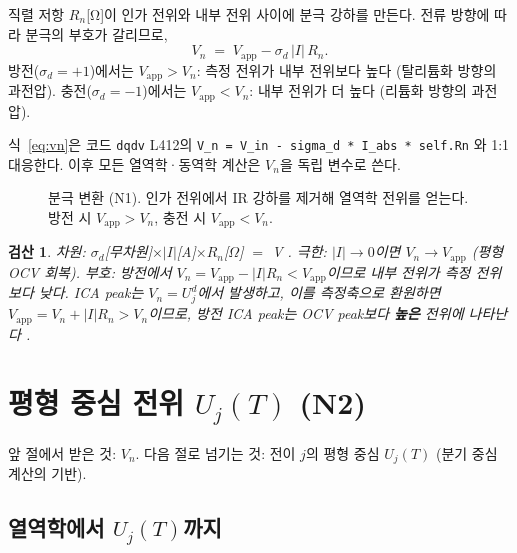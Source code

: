 \documentclass[11pt,a4paper]{article}
\newtheorem*{verifybox}{검산}
\newcommand{\app}{\mathrm{app}}
\begin{document}
직렬 저항 $R_n$[Ω]이 인가 전위와 내부 전위 사이에 분극 강하를 만든다.
전류 방향에 따라 분극의 부호가 갈리므로,
\begin{equation}
  \boxed{V_n \;=\; V_\app - \sigma_d\,|I|\,R_n.}
  \label{eq:vn}
\end{equation}
방전($\sigma_d=+1$)에서는 $V_\app > V_n$: 측정 전위가 내부 전위보다 높다
(탈리튬화 방향의 과전압).
충전($\sigma_d=-1$)에서는 $V_\app < V_n$: 내부 전위가 더 높다
(리튬화 방향의 과전압).

식~\eqref{eq:vn}은 코드 \texttt{dqdv} L412의 \texttt{V\_n = V\_in - sigma\_d * I\_abs * self.Rn}
와 1:1 대응한다. 이후 모든 열역학·동역학 계산은 $V_n$을 독립 변수로 쓴다.

\begin{figure}[h]
\centering
{}
\caption{분극 변환 (N1). 인가 전위에서 IR 강하를 제거해 열역학 전위를 얻는다.
방전 시 $V_\app > V_n$, 충전 시 $V_\app < V_n$.}
\label{fig:polar}
\end{figure}

\begin{verifybox}
차원: $\sigma_d$[무차원]$\times|I|$[A]$\times R_n$[$\Omega$] $=$ V \checkmark.
극한: $|I|\to0$이면 $V_n\to V_\app$ (평형 OCV 회복).
부호: 방전에서 $V_n = V_\app - |I|R_n < V_\app$이므로 내부 전위가 측정 전위보다 낮다.
ICA peak는 $V_n = U_j^d$에서 발생하고, 이를 측정축으로 환원하면
$V_\app = V_n + |I|R_n > V_n$이므로, 방전 ICA peak는 OCV peak보다
\textbf{높은} 전위에 나타난다 \checkmark.
\end{verifybox}

\section{평형 중심 전위 $U_j(T)$ (N2)}
\label{sec:Uj}
앞 절에서 받은 것: $V_n$.
다음 절로 넘기는 것: 전이 $j$의 평형 중심 $U_j(T)$ (분기 중심 계산의 기반).

\subsection{열역학에서 $U_j(T)$까지}
\end{document}
